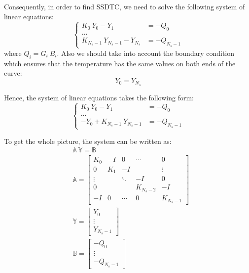 Consequently, in order to find SSDTC, we need to solve the following system of linear equations:
\[
  \begin{cases}
    K_0 \: Y_0 - Y_1 & = -Q_0 \\
    ... \\
    K_{N_s - 1} \: Y_{N_s - 1} - Y_{N_s} & = -Q_{N_s - 1}
  \end{cases}
\]
where $Q_i = G_i \: B_i$. Also we should take into account the boundary condition which ensures that the temperature has the same values on both ends of the curve:
\begin{equation} \label{eq:boundary-condition}
  Y_0 = Y_{N_s}
\end{equation}

Hence, the system of linear equations takes the following form:
\[
  \begin{cases}
    K_0 \: Y_0 - Y_1 & = -Q_0 \\
    ... \\
    -Y_0 + K_{N_s - 1} \: Y_{N_s - 1} & = -Q_{N_s - 1}
  \end{cases}
\]

To get the whole picture, the system can be written as:
\begin{align}
  & \mathbb{A} \: \mathbb{Y} = \mathbb{B} \label{eq:system} \\
  & \mathbb{A} = \left[
    \begin{array}{ccccc}
      K_0 & -I & 0 & \cdots & 0 \\
      0 & K_1 & -I &  & \vdots \\
      \vdots &  & \ddots & -I & 0 \\
      0 &  &  & K_{N_s - 2} & -I \\
      -I & 0 & \cdots & 0 & K_{N_s - 1}
    \end{array}
  \right] \nonumber \\
  & \mathbb{Y} = \left[
    \begin{array}{c}
      Y_0 \\
      \vdots \\
      Y_{N_s - 1}
    \end{array}
  \right] \nonumber \\
  & \mathbb{B} = \left[
    \begin{array}{c}
      -Q_0 \\
      \vdots \\
      -Q_{N_s - 1}
    \end{array}
  \right] \nonumber
\end{align}

